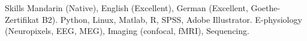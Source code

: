 \begin{rubric}{Skills}
\entry*[Language]
    Mandarin (Native), English (Excellent), German (Excellent, Goethe-Zertifikat B2).
    Python, Linux, Matlab, R, SPSS, Adobe Illustrator.
    E-physiology (Neuropixels, EEG, MEG), Imaging (confocal, fMRI), Sequencing.
\end{rubric}